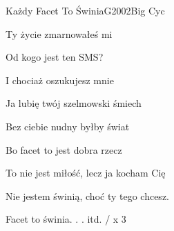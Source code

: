 \begin{song}{Każdy Facet To Świnia}{G}{2002}{Big Cyc}{}{}
\begin{SBVerse}
    Ty życie zmarnowałeś mi

    Od kogo jest ten SMS?

    I chociaż oszukujesz mnie

    Ja lubię twój szelmowski śmiech

    Bez ciebie nudny byłby świat

    Bo facet to jest dobra rzecz

    To nie jest miłość, lecz ja kocham Cię

    Nie jestem świnią, choć ty tego chcesz.
  \end{SBVerse}
  \begin{SBChorus}
    Facet to świnia. . . itd. / x 3
  \end{SBChorus}
\end{song}
